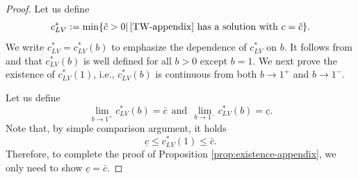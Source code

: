 \documentclass[11pt,a4paper]{article}
\numberwithin{equation}{section}
\numberwithin{figure}{section}
\newcommand\beaa{\begin{eqnarray*}}
\newcommand\eeaa{\end{eqnarray*}}
\begin{document}
\begin{proof}
Let us define
\beaa
c_{LV}^{*}:=\min\{\hat{c}>0|\, \mbox{\eqref{TW-appendix}  has a solution with $c=\hat{c}$}\}.
\eeaa
We write $c_{LV}^{*}=c_{LV}^{*}(b)$ to emphasize the dependence of $c_{LV}^{*}$ on $b$.
It follows from \cite{Kan-on1997} and \cite[Example 4.2]{Lewis Li Weinberger 2} that $c_{LV}^{*}(b)$ is well defined for all $b>0$ except $b=1$. We next prove the existence of $c_{LV}^{*}(1)$, i.e., $c_{LV}^{*}(b)$ is continuous from both $b\to 1^+$ and $b\to 1^-$.

Let us define 
$$\lim_{b\to 1^+}c_{LV}^{*}(b)=\bar c\ \ \text{and}\ \ \lim_{b\to 1^-}c_{LV}^{*}(b)=\underline c.$$
 Note that, by simple comparison argument, it holds
$$\underline c\le c_{LV}^{*}(1)\le \bar c.$$
Therefore, to complete the proof of Proposition \ref{prop:existence-appendix}, we only need to show $\underline c=\bar c$.




\end{proof}
\end{document}
